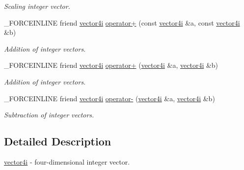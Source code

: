 \begin{DoxyCompactItemize}
\begin{DoxyCompactList}\small\item\em Scaling integer vector. \end{DoxyCompactList}\item 
\hypertarget{classbt_1_1vector4i_a34e2ef76984c06592f84238f379ff5a9}{\-\_\-\-F\-O\-R\-C\-E\-I\-N\-L\-I\-N\-E friend \hyperlink{classbt_1_1vector4i}{vector4i} \hyperlink{classbt_1_1vector4i_a34e2ef76984c06592f84238f379ff5a9}{operator+} (const \hyperlink{classbt_1_1vector4i}{vector4i} \&a, const \hyperlink{classbt_1_1vector4i}{vector4i} \&b)}\label{classbt_1_1vector4i_a34e2ef76984c06592f84238f379ff5a9}

\begin{DoxyCompactList}\small\item\em Addition of integer vectors. \end{DoxyCompactList}\item 
\hypertarget{classbt_1_1vector4i_a3d00f5c3cf6ff93f5f2ed5200b82a6df}{\-\_\-\-F\-O\-R\-C\-E\-I\-N\-L\-I\-N\-E friend \hyperlink{classbt_1_1vector4i}{vector4i} \hyperlink{classbt_1_1vector4i_a3d00f5c3cf6ff93f5f2ed5200b82a6df}{operator+} (\hyperlink{classbt_1_1vector4i}{vector4i} \&a, \hyperlink{classbt_1_1vector4i}{vector4i} \&b)}\label{classbt_1_1vector4i_a3d00f5c3cf6ff93f5f2ed5200b82a6df}

\begin{DoxyCompactList}\small\item\em Addition of integer vectors. \end{DoxyCompactList}\item 
\hypertarget{classbt_1_1vector4i_a2d92e2cd53321f643e4d987be5b9c802}{\-\_\-\-F\-O\-R\-C\-E\-I\-N\-L\-I\-N\-E friend \hyperlink{classbt_1_1vector4i}{vector4i} \hyperlink{classbt_1_1vector4i_a2d92e2cd53321f643e4d987be5b9c802}{operator-\/} (\hyperlink{classbt_1_1vector4i}{vector4i} \&a, \hyperlink{classbt_1_1vector4i}{vector4i} \&b)}\label{classbt_1_1vector4i_a2d92e2cd53321f643e4d987be5b9c802}

\begin{DoxyCompactList}\small\item\em Subtraction of integer vectors. \end{DoxyCompactList}\end{DoxyCompactItemize}


\subsection{Detailed Description}
\hyperlink{classbt_1_1vector4i}{vector4i} -\/ four-\/dimensional integer vector. 

